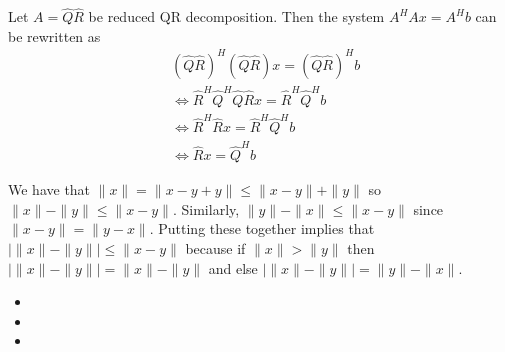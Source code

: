 \documentclass[12pt]{article}
\newenvironment{problem}[2][Problem]{\begin{trivlist}
\item[\hskip \labelsep {\bfseries #1}\hskip \labelsep {\bfseries #2}]}{\end{trivlist}}
\begin{document}
\begin{problem}{16.} 
\end{problem}

\begin{problem}{17.} 
Let $A = \widehat{Q}\widehat{R}$ be reduced QR decomposition. Then the system $A^HAx = A^Hb$ can be rewritten as 
\begin{equation*}
\begin{aligned}
&(\widehat{Q}\widehat{R})^H(\widehat{Q}\widehat{R})x = (\widehat{Q}\widehat{R})^Hb\\
& \Leftrightarrow \widehat{R}^H\widehat{Q}^H\widehat{Q}\widehat{R}x = \widehat{R}^H\widehat{Q}^Hb \\ &\Leftrightarrow \widehat{R}^H\widehat{R}x = \widehat{R}^H\widehat{Q}^Hb \\
&\Leftrightarrow \widehat{R}x = \widehat{Q}^Hb 
\end{aligned}
\end{equation*}
\end{problem}

\begin{problem}{23.} 
We have that $\|x\| = \|x - y + y\| \leq \|x-y\| + \|y\|$ so  $\|x\| - \|y\|  \leq \|x-y\| $. Similarly, $\|y\| - \|x\|  \leq \|x-y\|$ since $\|x-y\| = \|y-x\|$. Putting these together implies that $|\|x\| - \|y\|| \leq \|x-y\|$ because if $\|x\| > \|y\|$ then $|\|x\| - \|y\|| =  \|x\| - \|y\| $ and else $|\|x\| - \|y\|| = \|y\| - \|x\|$.
\end{problem}

\begin{problem}{24.} \hfill
\begin{itemize}
\item [(i)] 
\item [(ii)] 
\item [(iii)]
\end{itemize} 
\end{problem}

\begin{problem}{26.} 
\end{problem}


\begin{problem}{28.} 
\end{problem}


\begin{problem}{29.} 
\end{problem}


\begin{problem}{30.} 
\end{problem}
\end{document}
